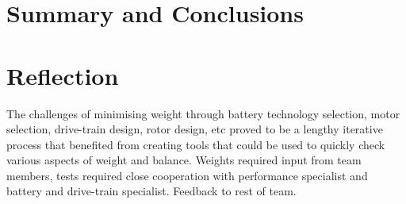 \documentclass[11pt,a4paper]{article}
\begin{document}
\section{Summary and Conclusions}

\section{Reflection}
 The challenges of minimising weight through battery technology selection, motor selection, drive-train design, rotor design, etc proved to be a lengthy iterative process that benefited from creating tools that could be used to quickly check various aspects of weight and balance. 
Weights required input from team members, tests required close cooperation with performance specialist and battery and drive-train specialist. Feedback to rest of team.
\end{document}
